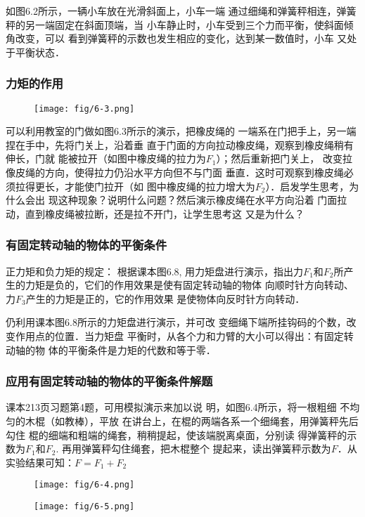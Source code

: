 如图6.2所示，一辆小车放在光滑斜面上，小车一端
通过细绳和弹簧秤相连，弹簧秤的另一端固定在斜面顶端，当
小车静止时，小车受到三个力而平衡，使斜面倾角改变，可以
看到弹簧秤的示数也发生相应的变化，达到某一数值时，小车
又处于平衡状态．



\subsubsection{力矩的作用}

\begin{figure}[htp]
    \centering
    \texttt{[image: fig/6-3.png]}
    \caption{}
\end{figure}

可以利用教室的门做如图6.3所示的演示，把橡皮绳的
一端系在门把手上，另一端捏在手中，先将门关上，沿着垂
直于门面的方向拉动橡皮绳，观察到橡皮绳稍有伸长，门就
能被拉开（如图中橡皮绳的拉力为$F_1$）；然后重新把门关上，
改变拉像皮绳的方向，使得拉力仍沿水平方向但不与门面
垂直．这时可观察到橡皮绳必须拉得更长，才能使门拉开（如
图中橡皮绳的拉力增大为$F_2$）．启发学生思考，为什么会出
现这种现象？说明什么问题？然后演示橡皮绳在水平方向沿着
门面拉动，直到橡皮绳被拉断，还是拉不开门，让学生思考这
又是为什么？

\subsubsection{有固定转动轴的物体的平衡条件}
正力矩和负力矩的规定：
根据课本图6.8, 用力矩盘进行演示，指出力$F_1$和$F_2$所产
生的力矩是负的，它们的作用效果是使有固定转动轴的物体
向顺时针方向转动、力$F_3$产生的力矩是正的，它的作用效果
是使物体向反时针方向转动．

仍利用课本图6.8所示的力矩盘进行演示，并可改
变细绳下端所挂钩码的个数，改变作用点的位置．当力矩盘
平衡时，从各个力和力臂的大小可以得出：有固定转动轴的物
体的平衡条件是力矩的代数和等于零．

\subsubsection{应用有固定转动轴的物体的平衡条件解题}
课本213页习题第4题，可用模拟演示来加以说
明，如图6.4所示，将一根粗细
不均匀的木棍（如教棒），平放
在讲台上，在棍的两端各系一个细绳套，用弹簧秤先后勾住
棍的细端和粗端的绳套，稍稍提起，使该端脱离桌面，分别读
得弹簧秤的示数为$F_1$和$F_2$. 再用弹簧秤勾住绳套，把木棍整个
提起来，读出弹簧秤示数为$F$．从实验结果可知：$F=F_1+F_2$
\begin{figure}[htp]\centering
    \begin{minipage}[t]{0.48\textwidth}
    \centering
    \texttt{[image: fig/6-4.png]}
    \caption{}
    \end{minipage}
    \begin{minipage}[t]{0.48\textwidth}
    \centering
    \texttt{[image: fig/6-5.png]}
    \caption{}
    \end{minipage}
    \end{figure}


